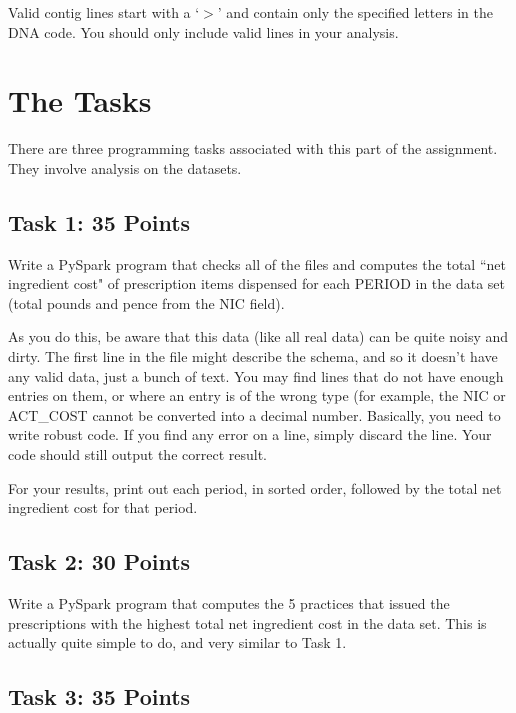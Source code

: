 \documentclass[11pt]{article}
\renewcommand\:{\colon} %
\begin{document}
Valid contig lines start with a `$>$' and contain only the specified letters in the DNA code.
You should only include valid lines in your analysis.


\section{The Tasks}

There are three programming tasks associated with this part of the assignment. They involve analysis on the datasets.

\subsection{Task 1: 35 Points}

Write a PySpark program that checks all of the files and computes the total ``net ingredient cost" of prescription items dispensed for each PERIOD in the data set (total pounds and pence from the NIC field). 

As you do this, be aware that this data (like all real data) can be quite noisy and dirty.  The first line in the file might
describe the schema, and so it doesn't have any valid data, just a bunch of text. 
You may  find lines that do not have enough entries on them, or where an entry is of the wrong type (for example,
the NIC or ACT\_COST cannot be converted into a  decimal number.  Basically, you need to write robust code.
If you find any error on a line, simply discard the line.
Your code should still output the correct result.

For your results, print out each period, in sorted order, followed by the total net ingredient cost for that period.



\subsection{Task 2: 30 Points}

Write a PySpark program that computes the 5 practices that issued the prescriptions with the highest total net ingredient cost in the data set.
 This is actually quite simple to do, and very similar to Task 1.

\subsection{Task 3: 35 Points}
\end{document}
